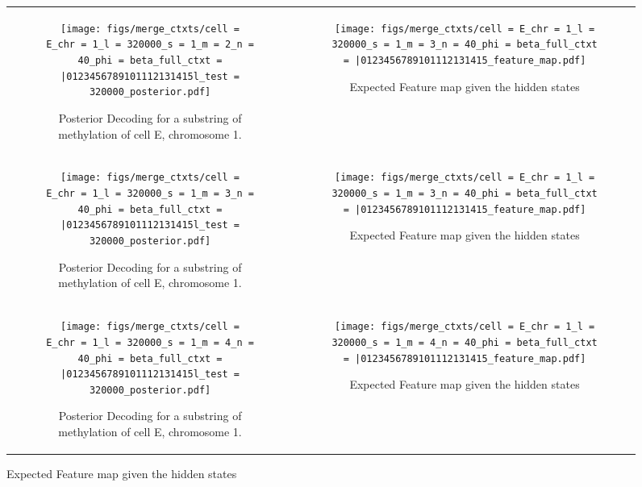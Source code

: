 \documentclass{article}
\begin{document}
\begin{figure}[H]
    \begin{tabular}{cc}
      \begin{subfigure}[t]{0.4\textwidth}
        \texttt{[image: figs/merge\_ctxts/cell = E\_chr = 1\_l = 320000\_s = 1\_m = 2\_n = 40\_phi = beta\_full\_ctxt = |0123456789101112131415l\_test = 320000\_posterior.pdf]}
        \caption{Posterior Decoding for a substring of methylation of cell E, chromosome 1.}
      \end{subfigure}
      &
      \begin{subfigure}[t]{0.4\textwidth}
        \texttt{[image: figs/merge\_ctxts/cell = E\_chr = 1\_l = 320000\_s = 1\_m = 3\_n = 40\_phi = beta\_full\_ctxt = |0123456789101112131415\_feature\_map.pdf]}
        \caption{Expected Feature map given the hidden states}
      \end{subfigure}
      \\
      \begin{subfigure}[t]{0.4\textwidth}
        \texttt{[image: figs/merge\_ctxts/cell = E\_chr = 1\_l = 320000\_s = 1\_m = 3\_n = 40\_phi = beta\_full\_ctxt = |0123456789101112131415l\_test = 320000\_posterior.pdf]}
        \caption{Posterior Decoding for a substring of methylation of cell E, chromosome 1.}
      \end{subfigure}
      &
      \begin{subfigure}[t]{0.4\textwidth}
        \texttt{[image: figs/merge\_ctxts/cell = E\_chr = 1\_l = 320000\_s = 1\_m = 3\_n = 40\_phi = beta\_full\_ctxt = |0123456789101112131415\_feature\_map.pdf]}
        \caption{Expected Feature map given the hidden states}
      \end{subfigure}
      \\
      \begin{subfigure}[t]{0.4\textwidth}
        \texttt{[image: figs/merge\_ctxts/cell = E\_chr = 1\_l = 320000\_s = 1\_m = 4\_n = 40\_phi = beta\_full\_ctxt = |0123456789101112131415l\_test = 320000\_posterior.pdf]}
        \caption{Posterior Decoding for a substring of methylation of cell E, chromosome 1.}
      \end{subfigure}
      &
      \begin{subfigure}[t]{0.4\textwidth}
        \texttt{[image: figs/merge\_ctxts/cell = E\_chr = 1\_l = 320000\_s = 1\_m = 4\_n = 40\_phi = beta\_full\_ctxt = |0123456789101112131415\_feature\_map.pdf]}
        \caption{Expected Feature map given the hidden states}
      \end{subfigure}
  \end{tabular}
\end{figure}
\end{document}
